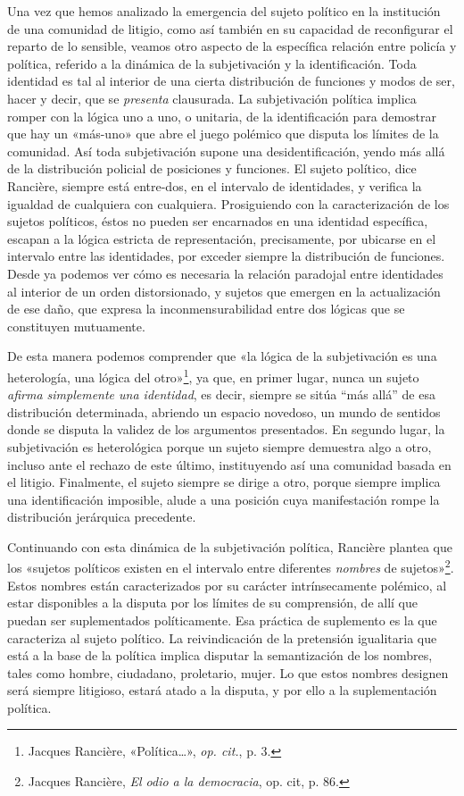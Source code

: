 Una vez que hemos analizado la emergencia del sujeto político en la institución de una comunidad de litigio, como así también en su capacidad de reconfigurar el reparto de lo sensible, veamos otro aspecto de la específica relación entre policía y política, referido a la dinámica de la subjetivación y la identificación. Toda identidad es tal al interior de una cierta distribución de funciones y modos de ser, hacer y decir, que se \emph{presenta} clausurada. La subjetivación política implica romper con la lógica uno a uno, o unitaria, de la identificación para demostrar que hay un «más-uno» que abre el juego polémico que disputa los límites de la comunidad. Así toda subjetivación supone una desidentificación, yendo más allá de la distribución policial de posiciones y funciones. El sujeto político, dice Rancière, siempre está entre-dos, en el intervalo de identidades, y verifica la igualdad de cualquiera con cualquiera. Prosiguiendo con la caracterización de los sujetos políticos, éstos no pueden ser encarnados en una identidad específica, escapan a la lógica estricta de representación, precisamente, por ubicarse en el intervalo entre las identidades, por exceder siempre la distribución de funciones. Desde ya podemos ver cómo es necesaria la relación paradojal entre identidades al interior de un orden distorsionado, y sujetos que emergen en la actualización de ese daño, que expresa la inconmensurabilidad entre dos lógicas que se constituyen mutuamente.

De esta manera podemos comprender que «la lógica de la subjetivación es una heterología, una lógica del otro»\footnote{Jacques Rancière, «Política\ldots», \emph{op. cit.}, p. 3.}, ya que, en primer lugar, nunca un sujeto \emph{afirma simplemente una identidad}, es decir, siempre se sitúa ``más allá'' de esa distribución determinada, abriendo un espacio novedoso, un mundo de sentidos donde se disputa la validez de los argumentos presentados. En segundo lugar, la subjetivación es heterológica porque un sujeto siempre demuestra algo a otro, incluso ante el rechazo de este último, instituyendo así una comunidad basada en el litigio. Finalmente, el sujeto siempre se dirige a otro, porque siempre implica una identificación imposible, alude a una posición cuya manifestación rompe la distribución jerárquica precedente.

Continuando con esta dinámica de la subjetivación política, Rancière plantea que los «sujetos políticos existen en el intervalo entre diferentes \emph{nombres} de sujetos»\footnote{Jacques Rancière, \emph{El odio a la democracia}, op. cit, p. 86.}. Estos nombres están caracterizados por su carácter intrínsecamente polémico, al estar disponibles a la disputa por los límites de su comprensión, de allí que puedan ser suplementados políticamente. Esa práctica de suplemento es la que caracteriza al sujeto político. La reivindicación de la pretensión igualitaria que está a la base de la política implica disputar la semantización de los nombres, tales como hombre, ciudadano, proletario, mujer. Lo que estos nombres designen será siempre litigioso, estará atado a la disputa, y por ello a la suplementación política.

